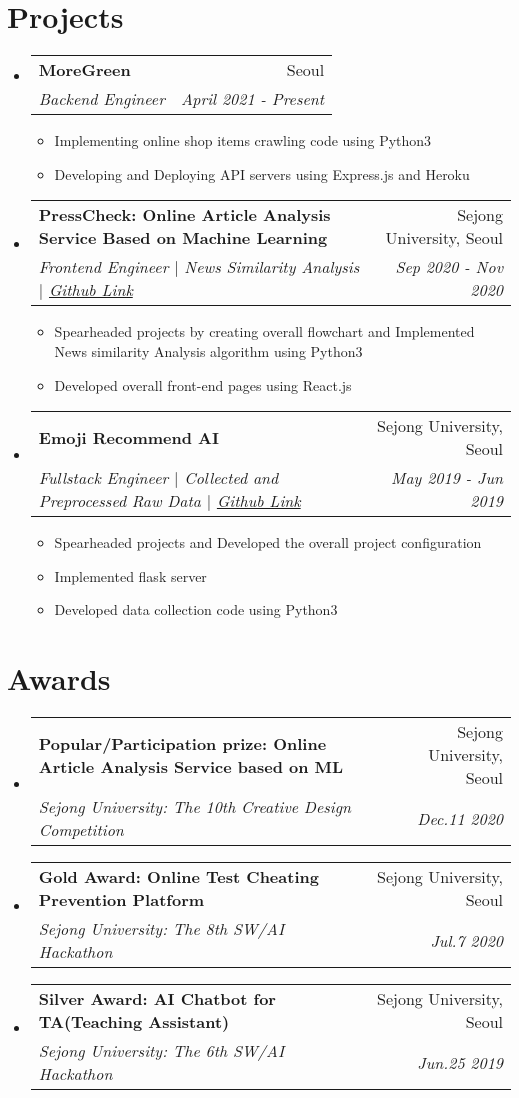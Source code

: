 \documentclass[letterpaper,11pt]{article}
\makeatletter
\newcommand{\resumeItem}[2]{
  \item\small{
    \textbf{#1}{ #2 \vspace{-2pt}}
  }
}
\newcommand{\resumeSubheading}[4]{
  \vspace{-1pt}\item
    \begin{tabular*}{0.97\textwidth}{l@{\extracolsep{\fill}}r}
      \textbf{#1} & #2 \\
      \textit{\small#3} & \textit{\small #4} \\
    \end{tabular*}\vspace{-10pt}
}
\newcommand{\resumeSubHeadingListStart}{\begin{itemize}[leftmargin=*]}
\newcommand{\resumeSubHeadingListEnd}{\end{itemize}}
\newcommand{\resumeItemListStart}{\begin{itemize}}
\newcommand{\resumeItemListEnd}{\end{itemize}\vspace{-5pt}}
\makeatother
\begin{document}
\section{Projects}
  \resumeSubHeadingListStart
    \resumeSubheading
      {MoreGreen}{Seoul}
      { Backend Engineer }{April 2021 - Present}
      \resumeItemListStart
        \resumeItem {}
          {Implementing online shop items crawling code using Python3}
        \resumeItem {}
          {Developing and Deploying API servers using Express.js and Heroku}
      \resumeItemListEnd
    \resumeSubheading
      {PressCheck: Online Article Analysis Service Based on Machine Learning}{Sejong University, Seoul}
      {Frontend Engineer $\vert$ News Similarity Analysis $\vert$ {\href{https://github.com/reyeon1209/PressCheck}{Github Link}}}{Sep 2020 - Nov 2020}
      \resumeItemListStart
        \resumeItem {}
          {Spearheaded projects by creating overall flowchart and Implemented News similarity Analysis algorithm using Python3}
        \resumeItem {}
          {Developed overall front-end pages using React.js}
      \resumeItemListEnd
    \resumeSubheading
      {Emoji Recommend AI}{Sejong University, Seoul}
      {Fullstack Engineer $\vert$ Collected and Preprocessed Raw Data $\vert$ {\href{https://github.com/sejongresearch/EmojiRecommend}{Github Link}}}{May 2019 - Jun 2019}
      \resumeItemListStart
        \resumeItem {}
          {Spearheaded projects and Developed the overall project configuration}
        \resumeItem {}
          {Implemented flask server}
        \resumeItem {}
          {Developed data collection code using Python3}
      \resumeItemListEnd
  \resumeSubHeadingListEnd

\section{Awards}
  \resumeSubHeadingListStart
    \resumeSubheading
      {Popular/Participation prize: Online Article Analysis Service based on ML}{Sejong University, Seoul}
      {Sejong University: The 10th Creative Design Competition}{Dec.11 2020}
    \resumeSubheading
      {Gold Award: Online Test Cheating Prevention Platform}{Sejong University, Seoul}
      {Sejong University: The 8th SW/AI Hackathon}{Jul.7 2020}
    \resumeSubheading
      {Silver Award: AI Chatbot for TA(Teaching Assistant)}{Sejong University, Seoul}
      {Sejong University: The 6th SW/AI Hackathon}{Jun.25 2019}
    \resumeItemListStart
        \textbf{}
        {}
        {}
    \resumeItemListEnd
  \resumeSubHeadingListEnd
  
\end{document}
